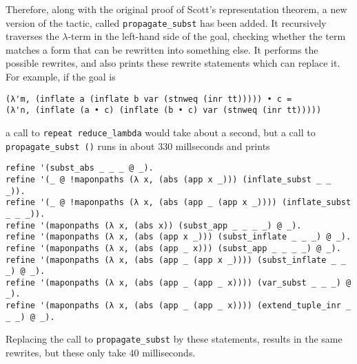 Therefore, along with the original proof of Scott's representation theorem, a new version of the tactic, called \texttt{propagate\_subst} has been added. It recursively traverses the $ \lambda $-term in the left-hand side of the goal, checking whether the term matches a form that can be rewritten into something else. It performs the possible rewrites, and also prints these rewrite statements which can replace it. For example, if the goal is
\begin{lstlisting}
(λ'm, (inflate a (inflate b var (stnweq (inr tt))))) • c =
(λ'n, (inflate (a • c) (inflate (b • c) var (stnweq (inr tt)))))
\end{lstlisting}
a call to \texttt{repeat reduce\_lambda} would take about a second, but a call to \texttt{propagate\_subst ()} runs in about $ 330 $ millseconds and prints
\begin{lstlisting}
refine '(subst_abs _ _ _ @ _).
refine '(_ @ !maponpaths (λ x, (abs (app x _))) (inflate_subst _ _ _)).
refine '(_ @ !maponpaths (λ x, (abs (app _ (app x _)))) (inflate_subst _ _ _)).
refine '(maponpaths (λ x, (abs x)) (subst_app _ _ _ _) @ _).
refine '(maponpaths (λ x, (abs (app x _))) (subst_inflate _ _ _) @ _).
refine '(maponpaths (λ x, (abs (app _ x))) (subst_app _ _ _ _) @ _).
refine '(maponpaths (λ x, (abs (app _ (app x _)))) (subst_inflate _ _ _) @ _).
refine '(maponpaths (λ x, (abs (app _ (app _ x)))) (var_subst _ _ _) @ _).
refine '(maponpaths (λ x, (abs (app _ (app _ x)))) (extend_tuple_inr _ _ _) @ _).
\end{lstlisting}
Replacing the call to \texttt{propagate\_subst} by these statements, results in the same rewrites, but these only take $ 40 $ milliseconds.

